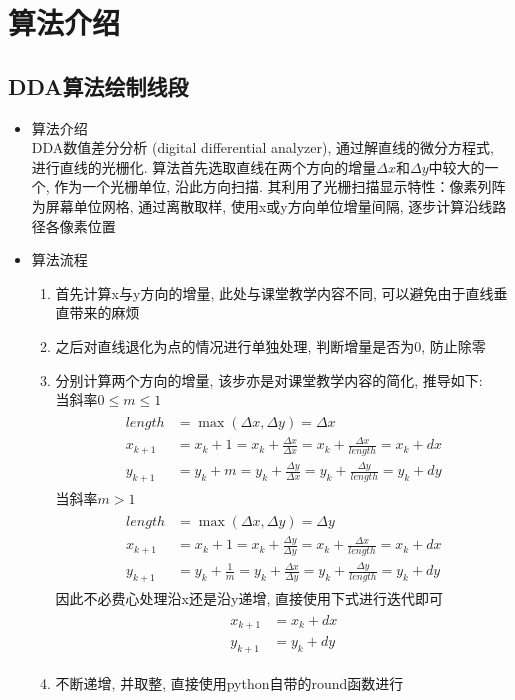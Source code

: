 \documentclass[a4paper,UTF8]{article}
\theoremstyle{definition}
\begin{document}
\section{算法介绍}
\subsection{DDA算法绘制线段}
\begin{itemize}
  \item 算法介绍\\
  DDA数值差分分析 (digital differential analyzer), 通过解直线的微分方程式, 进行直线的光栅化. 算法首先选取直线在两个方向的增量$\Delta x$和$\Delta y$中较大的一个, 作为一个光栅单位, 沿此方向扫描. 其利用了光栅扫描显示特性：像素列阵为屏幕单位网格, 通过离散取样, 使用x或y方向单位增量间隔, 逐步计算沿线路径各像素位置\\
  \item 算法流程
  \begin{enumerate}
    \item 首先计算x与y方向的增量, 此处与课堂教学内容不同, 可以避免由于直线垂直带来的麻烦
    \item 之后对直线退化为点的情况进行单独处理, 判断增量是否为0, 防止除零
    \item 分别计算两个方向的增量, 该步亦是对课堂教学内容的简化, 推导如下:\\
    当斜率$0\leq m\leq 1$
    \begin{align}
      \begin{split}
        length &= \max(\Delta x, \Delta y) = \Delta x\\
        x_{k+1} &= x_k + 1 = x_k + \frac{\Delta x}{\Delta x} = x_k + \frac{\Delta x}{length} = x_k + dx\\
        y_{k+1} &= y_k + m = y_k + \frac{\Delta y}{\Delta x} = y_k + \frac{\Delta y}{length} = y_k + dy
      \end{split}
    \end{align}
    当斜率$m > 1$
    \begin{align}
      \begin{split}
        length &= \max(\Delta x, \Delta y) = \Delta y\\
        x_{k+1} &= x_k + 1 = x_k + \frac{\Delta y}{\Delta y} = x_k + \frac{\Delta x}{length} = x_k + dx\\
        y_{k+1} &= y_k + \frac{1}{m} = y_k + \frac{\Delta x}{\Delta y} = y_k + \frac{\Delta y}{length} = y_k + dy
      \end{split}
    \end{align}
    因此不必费心处理沿x还是沿y递增, 直接使用下式进行迭代即可\cite{rog_2002}
    \begin{align}
      \begin{split}
        x_{k+1} &= x_k + dx\\
        y_{k+1} &= y_k + dy
      \end{split}
    \end{align}
    \item 不断递增, 并取整, 直接使用python自带的round函数进行
  \end{enumerate}
  

\end{itemize}
\end{document}
